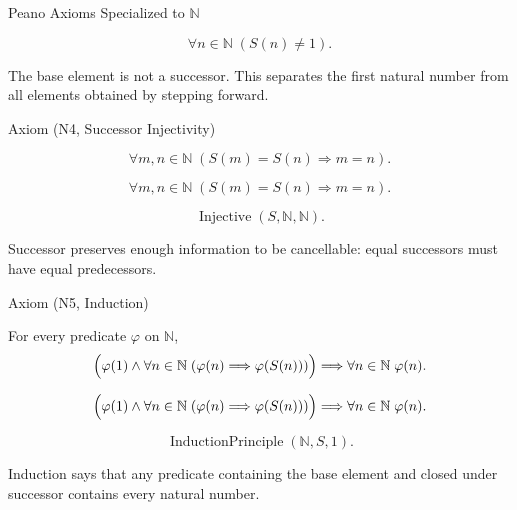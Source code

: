 \begin{topicbox}{Peano Axioms Specialized to \texorpdfstring{$\mathbb{N}$}{N}}
\begin{remark*}
\[
\forall n \in \mathbb{N}\;(S(n)\ne 1).
\]
\end{remark*}

\begin{remark*}[Interpretation]
The base element is not a successor. This separates the first natural number
from all elements obtained by stepping forward.
\end{remark*}

\NoLocalDependencies

\begin{axiombox}{Axiom (N4, Successor Injectivity)}
\begin{axiom}
\label{ax:n-successor-injective}
\[
\forall m,n \in \mathbb{N}\;(S(m)=S(n)\Longrightarrow m=n).
\]
\end{axiom}
\end{axiombox}

\begin{remark*}
\[
\forall m,n \in \mathbb{N}\;(S(m)=S(n)\Longrightarrow m=n).
\]
\end{remark*}

\begin{remark*}
\[
\operatorname{Injective}(S,\mathbb{N},\mathbb{N}).
\]
\end{remark*}

\begin{remark*}[Interpretation]
Successor preserves enough information to be cancellable: equal successors
must have equal predecessors.
\end{remark*}

\NoLocalDependencies

\begin{axiombox}{Axiom (N5, Induction)}
\begin{axiom}[N5, Induction]
\label{ax:n-induction}
For every predicate $\varphi$ on $\mathbb{N}$,
\[
\Bigl(\varphi(1)\land
\forall n\in\mathbb{N}\;(\varphi(n)\Longrightarrow \varphi(S(n)))\Bigr)
\Longrightarrow
\forall n\in\mathbb{N}\;\varphi(n).
\]
\end{axiom}
\end{axiombox}

\begin{remark*}
\[
\Bigl(\varphi(1)\land
\forall n\in\mathbb{N}\;(\varphi(n)\Longrightarrow \varphi(S(n)))\Bigr)
\Longrightarrow
\forall n\in\mathbb{N}\;\varphi(n).
\]
\end{remark*}

\begin{remark*}
\[
\operatorname{InductionPrinciple}(\mathbb{N},S,1).
\]
\end{remark*}

\begin{remark*}[Interpretation]
Induction says that any predicate containing the base element and closed under
successor contains every natural number.
\end{remark*}

\NoLocalDependencies
\end{topicbox}
